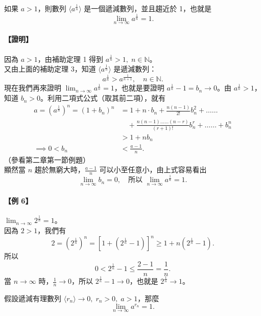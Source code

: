 \begin{theorem}
如果 $a > 1$，則數列 $\langle a^{\frac{1}{n}} \rangle$ 是一個遞減數列，並且趨近於 1，也就是
\begin{equation}
\lim_{n\to\infty} a^{\frac{1}{n}} = 1. \label{eq:b2-ch4-lim-a-1-over-n}
\end{equation}
\end{theorem}
\paragraph{【證明】} 因為 $a > 1$，由補助定理 1 得到 $a^{\frac{1}{n}} > 1,\; n \in \mathbb{N}$。\\
又由上面的補助定理 3，知道 $\langle a^{\frac{1}{n}} \rangle$ 是遞減數列：
\[
a^{\frac{1}{n}} > a^{\frac{1}{n+1}},\quad n \in \mathbb{N}.
\]
現在我們再來證明 $\lim_{n\to\infty} a^{\frac{1}{n}} = 1$，也就是要證明 $a^{\frac{1}{n}} - 1 = b_n \to 0$。由 $a^{\frac{1}{n}} > 1$，知道 $b_n > 0$。利用二項式公式（取其前二項），就有
\begin{align*}
a = (a^{\frac{1}{n}})^n = (1+b_n)^n &= 1 + n \cdot b_n + \frac{n(n-1)}{2!} b_n^2 + \dots\dots \\
&\quad + \frac{n(n-1)\dots\dots(n-r)}{(r+1)!} b_n^r + \dots\dots + b_n^n \\
&> 1 + n b_n \\
\implies 0 < b_n &< \frac{a-1}{n}.
\end{align*}
（參看第二章第一節例題）\\
顯然當 $n$ 趨於無窮大時，$\frac{a-1}{n}$ 可以小至任意小，由上式容易看出
\[
\lim_{n\to\infty} b_n = 0, \quad \text{所以 } \lim_{n\to\infty} a^{\frac{1}{n}} = 1.
\]

\paragraph{【例 6】} $\lim_{n\to\infty} 2^{\frac{1}{n}} = 1$。\\
因為 $2 > 1$，我們有
\[
2 = (2^{\frac{1}{n}})^n = [1+(2^{\frac{1}{n}}-1)]^n \ge 1+n(2^{\frac{1}{n}}-1).
\]
所以
\[
0 < 2^{\frac{1}{n}} - 1 \le \frac{2-1}{n} = \frac{1}{n}.
\]
當 $n \to \infty$ 時，$\frac{1}{n} \to 0$，所以 $2^{\frac{1}{n}} - 1 \to 0$，也就是 $2^{\frac{1}{n}} \to 1$。

\begin{prop}[推論 1]
假設遞減有理數列 $\langle r_n \rangle \to 0,\; r_n > 0,\; a > 1$，那麼
\[
\lim_{n\to\infty} a^{r_n} = 1.
\]
\end{prop}
